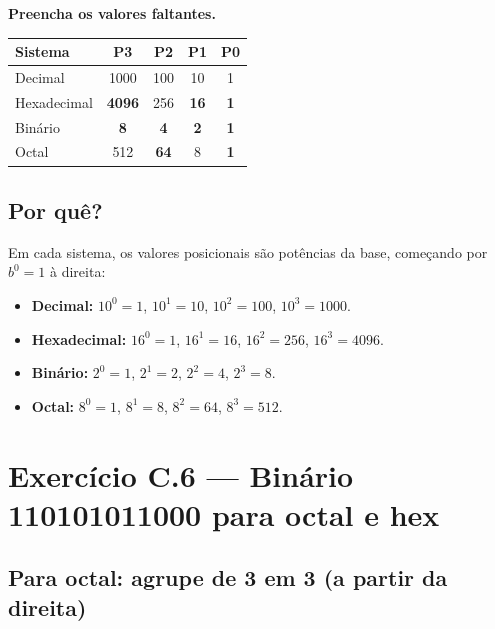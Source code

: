\documentclass[11pt,a4paper]{article}
\begin{document}
\textbf{Preencha os valores faltantes.}

\begin{resposta}
\begin{center}
\renewcommand{\arraystretch}{1.3}
\begin{tabular}{|l|c|c|c|c|}
\hline
\textbf{Sistema} & \textbf{P3} & \textbf{P2} & \textbf{P1} & \textbf{P0} \\
\hline
Decimal     & 1000 & 100 & 10 & 1 \\
Hexadecimal & \textbf{4096} & 256 & \textbf{16} & \textbf{1} \\
Bin\'ario    & \textbf{8} & \textbf{4} & \textbf{2} & \textbf{1} \\
Octal       & 512 & \textbf{64} & 8 & \textbf{1} \\
\hline
\end{tabular}
\end{center}
\end{resposta}

\subsection*{Por qu\^e?}

Em cada sistema, os valores posicionais s\~ao pot\^encias da base, come\c{c}ando por $b^0 = 1$ \`a direita:

\begin{itemize}[leftmargin=*,itemsep=0pt]
  \item \textbf{Decimal:} $10^0=1$, $10^1=10$, $10^2=100$, $10^3=1000$.
  \item \textbf{Hexadecimal:} $16^0=1$, $16^1=16$, $16^2=256$, $16^3=4096$.
  \item \textbf{Bin\'ario:} $2^0=1$, $2^1=2$, $2^2=4$, $2^3=8$.
  \item \textbf{Octal:} $8^0=1$, $8^1=8$, $8^2=64$, $8^3=512$.
\end{itemize}

\section{Exerc\'icio C.6 --- Bin\'ario 110101011000 para octal e hex}

\subsection*{Para octal: agrupe de 3 em 3 (a partir da direita)}
\end{document}
